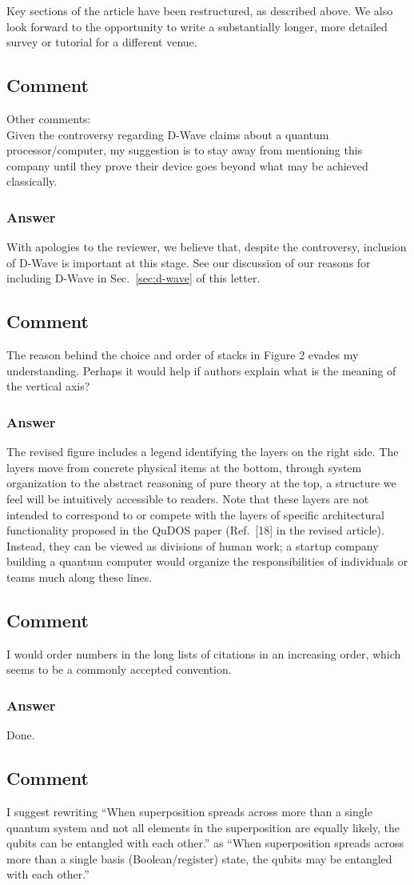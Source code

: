 \documentclass{article}
\newcommand{\comment}{\subsection{Comment}\em}
\newcommand{\answer}{\rm \subsubsection*{Answer}}
\begin{document}
Key sections of the article have been restructured, as described
above.  We also look forward to the opportunity to write a
substantially longer, more detailed survey or tutorial for a different
venue.

\comment

Other comments:\\
Given the controversy regarding D-Wave claims about a quantum
processor/computer, my suggestion is to stay away from mentioning this
company until they prove their device goes beyond what may be achieved
classically.

\answer

With apologies to the reviewer, we believe that, despite the
controversy, inclusion of D-Wave is important at this stage.  See our
discussion of our reasons for including D-Wave in
Sec.~\ref{sec:d-wave} of this letter.

\comment

The reason behind the choice and order of stacks in Figure 2 evades my
understanding. Perhaps it would help if authors explain what is the
meaning of the vertical axis?

\answer

The revised figure includes a legend identifying the layers on the
right side.  The layers move from concrete physical items at the
bottom, through system organization to the abstract reasoning of pure
theory at the top, a structure we feel will be intuitively accessible
to readers.  Note that these layers are not intended to correspond to
or compete with the layers of specific architectural functionality
proposed in the QuDOS paper (Ref.~[18] in the revised article).
Instead, they can be viewed as divisions of human work; a startup
company building a quantum computer would organize the
responsibilities of individuals or teams much along these lines.

\comment

I would order numbers in the long lists of citations in an increasing
order, which seems to be a commonly accepted convention.

\answer

Done.

\comment

I suggest rewriting ``When superposition spreads across more than a
single quantum system and not all elements in the superposition are
equally likely, the qubits can be entangled with each other.'' as ``When
superposition spreads across more than a single basis
(Boolean/register) state, the qubits may be entangled with each
other.''
\end{document}
